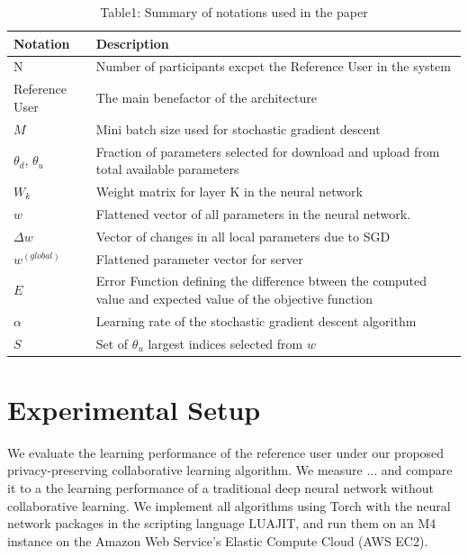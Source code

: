 \documentclass[conference]{IEEEtran}
\begin{document}
\begin{table}[!h]
\centering
\caption{Table1: Summary of notations used in the paper}
\label{table:1}
\begin{tabular}{ | m{} | m{}| } 
\hline
\textbf{Notation} & \textbf{Description} \\
 \hline\hline

N & Number of participants excpet the Reference User in the system\\
\hline
Reference User & The  main benefactor of the architecture \\
\hline
$M$ & Mini batch size used for stochastic gradient descent\\
\hline
$\theta_d$, $\theta_u$ & Fraction of parameters selected for download and upload from total available parameters \\
\hline
$W_k$ & Weight matrix for layer K in the neural network\\
\hline
$w$ & Flattened vector of all parameters in the neural network. \\
\hline
$\Delta w$ & Vector of changes in all local parameters due to SGD\\
\hline
$w^{(global)}$ & Flattened parameter vector for server\\
\hline
$E$ & Error Function defining the difference btween the computed value and expected value of the objective function \\
\hline
$\alpha$ & Learning rate of the stochastic gradient descent algorithm\\
\hline
$S$ & Set of $\theta_u$ largest indices selected from $w$ \\
\hline
\end{tabular}
\end{table}

\section{Experimental Setup}

We evaluate the learning performance of the reference user under our proposed privacy-preserving collaborative learning algorithm. We
measure ... and compare it to a the learning performance of a traditional deep neural network without collaborative learning. 
We implement all algorithms using Torch with the neural network packages in the scripting language LUAJIT, and run them 
on an M4 instance on the Amazon Web Service's Elastic Compute Cloud (AWS EC2).
\end{document}
